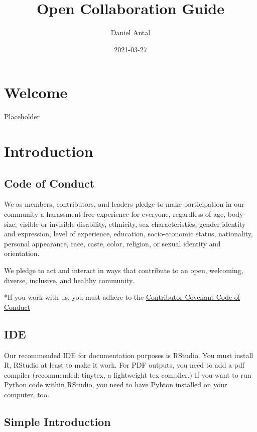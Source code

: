 \documentclass[
  fontsize=13pt,
  english,
  a4paper,
  openany, a4paper, oneside]{article}
\title{Open Collaboration Guide}
\author{Daniel Antal}
\date{2021-03-27}
\begin{document}
\maketitle

{
\hypersetup{linkcolor=}
\setcounter{tocdepth}{2}
\tableofcontents
}
\hypertarget{welcome}{%
\section{Welcome}\label{welcome}}

Placeholder

\hypertarget{intro}{%
\section{Introduction}\label{intro}}

\hypertarget{code-of-conduct}{%
\subsection{Code of Conduct}\label{code-of-conduct}}

We as members, contributors, and leaders pledge to make participation in our
community a harassment-free experience for everyone, regardless of age, body
size, visible or invisible disability, ethnicity, sex characteristics, gender
identity and expression, level of experience, education, socio-economic status,
nationality, personal appearance, race, caste, color, religion, or sexual identity and orientation.

We pledge to act and interact in ways that contribute to an open, welcoming,
diverse, inclusive, and healthy community.

*If you work with us, you must adhere to the \protect\hyperlink{covenant}{Contributor Covenant Code of Conduct}

\hypertarget{ide}{%
\subsection{IDE}\label{ide}}

Our recommended IDE for documentation purposes is RStudio. You must install R, RStudio at least to make it work. For PDF outputs, you need to add a pdf compiler (recommended: tinytex, a lightweight tex compiler.) If you want to run Python code within RStudio, you need to have Pyhton installed on your computer, too.

\hypertarget{simple-introduction}{%
\subsection{Simple Introduction}\label{simple-introduction}}
\end{document}
